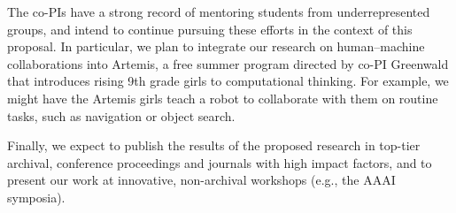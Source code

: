 

The co-PIs have a strong record of mentoring students from
underrepresented groups, and intend to continue pursuing these efforts
in the context of this proposal.  In particular, we plan to integrate
our research on human--machine collaborations into Artemis, a free
summer program directed by co-PI Greenwald that introduces rising 9th
grade girls to computational thinking.  For example, we might have the
Artemis girls teach a robot to collaborate with them on routine tasks,
such as navigation or object search.



Finally, we expect to publish the results of the proposed research in
top-tier archival, conference proceedings and journals with high
impact factors, and to present our work at innovative, non-archival
workshops (e.g., the AAAI symposia).

